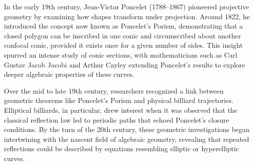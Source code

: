 \begin{historical}
In the early 19th century, Jean-Victor Poncelet (1788–1867) pioneered projective geometry by examining how shapes transform under projection. Around 1822, he introduced the concept now known as Poncelet’s Porism, demonstrating that a closed polygon can be inscribed in one conic and circumscribed about another confocal conic, provided it exists once for a given number of sides. This insight spurred an intense study of conic sections, with mathematicians such as Carl Gustav Jacob Jacobi and Arthur Cayley extending Poncelet’s results to explore deeper algebraic properties of these curves.

Over the mid to late 19th century, researchers recognized a link between geometric theorems like Poncelet’s Porism and physical billiard trajectories. Elliptical billiards, in particular, drew interest when it was observed that the classical reflection law led to periodic paths that echoed Poncelet’s closure conditions. By the turn of the 20th century, these geometric investigations began intertwining with the nascent field of algebraic geometry, revealing that repeated reflections could be described by equations resembling elliptic or hyperelliptic curves.


\end{historical}